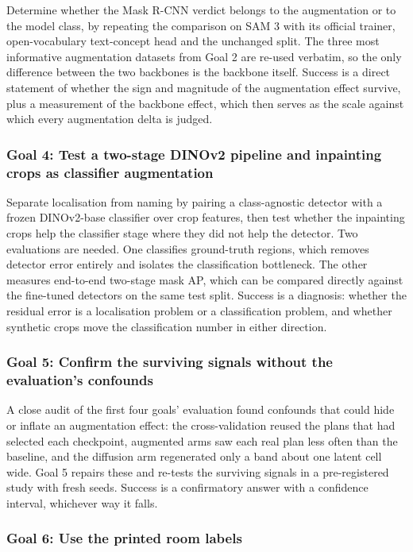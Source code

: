 Determine whether the Mask R-CNN verdict belongs to the augmentation or to the
model class, by repeating the comparison on SAM 3 with its official trainer,
open-vocabulary text-concept head and the unchanged split. The three most
informative augmentation datasets from Goal 2 are re-used verbatim, so the only
difference between the two backbones is the backbone itself. Success is a direct
statement of whether the sign and magnitude of the augmentation effect survive,
plus a measurement of the backbone effect, which then serves as the scale
against which every augmentation delta is judged.

\subsubsection{Goal 4: Test a two-stage DINOv2 pipeline and inpainting crops as classifier augmentation}

Separate localisation from naming by pairing a class-agnostic detector with a
frozen DINOv2-base classifier over crop features, then test whether the
inpainting crops help the classifier stage where they did not help the detector.
Two evaluations are needed. One classifies ground-truth regions, which removes
detector error entirely and isolates the classification bottleneck. The other
measures end-to-end two-stage mask AP, which can be compared directly against
the fine-tuned detectors on the same test split. Success is a diagnosis: whether
the residual error is a localisation problem or a classification problem, and whether synthetic crops move the classification number in either direction.

\subsubsection{Goal 5: Confirm the surviving signals without the evaluation's confounds}

A close audit of the first four goals' evaluation found confounds that could
hide or inflate an augmentation effect: the cross-validation reused the plans
that had selected each checkpoint, augmented arms saw each real plan less
often than the baseline, and the diffusion arm regenerated only a band about
one latent cell wide. Goal 5 repairs these and re-tests the surviving signals
in a pre-registered study with fresh seeds. Success is a confirmatory answer
with a confidence interval, whichever way it falls.

\subsubsection{Goal 6: Use the printed room labels}

